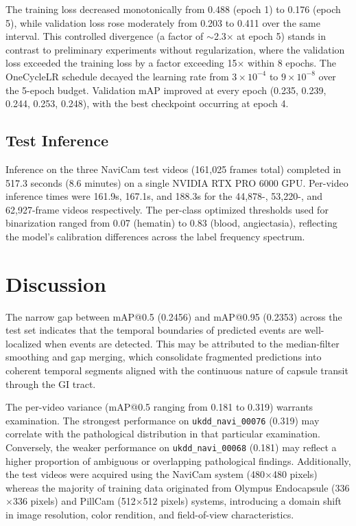 \documentclass[12pt]{article}
\begin{document}
The training loss decreased monotonically from 0.488 (epoch 1) to 0.176 (epoch 5), while validation loss rose moderately from 0.203 to 0.411 over the same interval. This controlled divergence (a factor of $\sim$2.3$\times$ at epoch 5) stands in contrast to preliminary experiments without regularization, where the validation loss exceeded the training loss by a factor exceeding 15$\times$ within 8 epochs. The OneCycleLR schedule decayed the learning rate from $3\times10^{-4}$ to $9\times10^{-8}$ over the 5-epoch budget. Validation mAP improved at every epoch (0.235, 0.239, 0.244, 0.253, 0.248), with the best checkpoint occurring at epoch 4.

\subsection{Test Inference}

Inference on the three NaviCam test videos (161,025 frames total) completed in 517.3 seconds (8.6 minutes) on a single NVIDIA RTX PRO 6000 GPU. Per-video inference times were 161.9s, 167.1s, and 188.3s for the 44,878-, 53,220-, and 62,927-frame videos respectively. The per-class optimized thresholds used for binarization ranged from 0.07 (hematin) to 0.83 (blood, angiectasia), reflecting the model's calibration differences across the label frequency spectrum.


\section{Discussion}\label{sec4}

The narrow gap between mAP@0.5 (0.2456) and mAP@0.95 (0.2353) across the test set indicates that the temporal boundaries of predicted events are well-localized when events are detected. This may be attributed to the median-filter smoothing and gap merging, which consolidate fragmented predictions into coherent temporal segments aligned with the continuous nature of capsule transit through the GI tract.

The per-video variance (mAP@0.5 ranging from 0.181 to 0.319) warrants examination. The strongest performance on \texttt{ukdd\_navi\_00076} (0.319) may correlate with the pathological distribution in that particular examination. Conversely, the weaker performance on \texttt{ukdd\_navi\_00068} (0.181) may reflect a higher proportion of ambiguous or overlapping pathological findings. Additionally, the test videos were acquired using the NaviCam system (480$\times$480 pixels) whereas the majority of training data originated from Olympus Endocapsule (336$\times$336 pixels) and PillCam (512$\times$512 pixels) systems, introducing a domain shift in image resolution, color rendition, and field-of-view characteristics.
\end{document}
